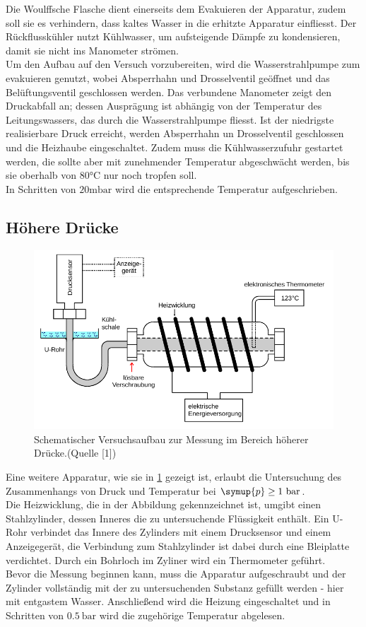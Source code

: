 Die Woulffsche Flasche dient einerseits dem Evakuieren der Apparatur, zudem soll sie es verhindern,
dass kaltes Wasser in die erhitzte Apparatur einfliesst. Der Rückflusskühler nutzt Kühlwasser, um
aufsteigende Dämpfe zu kondensieren, damit sie nicht ins Manometer strömen. \\
Um den Aufbau auf den Versuch vorzubereiten, wird die Wasserstrahlpumpe zum evakuieren genutzt,
wobei Absperrhahn und Drosselventil geöffnet und das Belüftungsventil geschlossen werden.
Das verbundene Manometer zeigt den Druckabfall an; dessen Ausprägung ist abhängig von der
Temperatur des Leitungswassers, das durch die Wasserstrahlpumpe fliesst. Ist der niedrigste realisierbare
Druck erreicht, werden Absperrhahn un Drosselventil geschlossen und die Heizhaube eingeschaltet.
Zudem muss die Kühlwasserzufuhr gestartet werden, die sollte aber mit zunehmender Temperatur abgeschwächt 
werden, bis sie oberhalb von $80 \si{\degreeCelsius}$ nur noch tropfen soll.\\
In Schritten von $20 \si{\milli\bar}$ wird die entsprechende Temperatur aufgeschrieben.

\subsection{Höhere Drücke}
\begin{figure}
    \centering
    \includegraphics[width=\textwidth]{apparatur2.png}
    \caption{Schematischer Versuchsaufbau zur Messung im Bereich höherer Drücke.(Quelle [1])}
    \label{fig:app2}
\end{figure}
\noindent Eine weitere Apparatur, wie sie in \ref{fig:app2} gezeigt ist, erlaubt die Untersuchung des Zusammenhangs
von Druck und Temperatur bei $\symup{p} \geq 1 \ \si{\bar}$.\\
Die Heizwicklung, die in der Abbildung gekennzeichnet ist, umgibt einen Stahlzylinder, dessen Inneres
die zu untersuchende Flüssigkeit enthält. Ein U-Rohr verbindet das Innere des Zylinders mit einem Drucksensor
und einem Anzeigegerät, die Verbindung zum Stahlzylinder ist dabei durch eine Bleiplatte 
verdichtet. Durch ein Bohrloch im Zyliner wird ein Thermometer geführt.\\
Bevor die Messung beginnen kann, muss die Apparatur aufgeschraubt und der Zylinder vollständig mit
der zu untersuchenden Substanz gefüllt werden - hier mit entgastem Wasser. Anschließend wird die Heizung
eingeschaltet und in Schritten von $0.5 \ \si{\bar}$ wird die zugehörige Temperatur abgelesen.